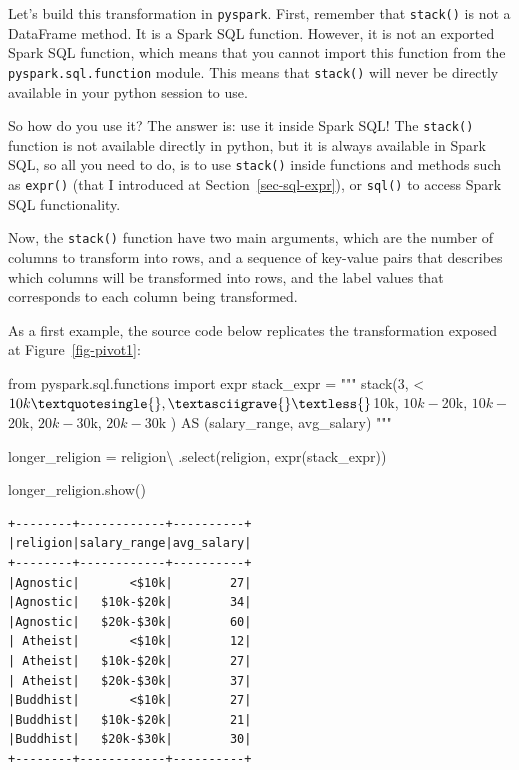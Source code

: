 \documentclass[
  11pt,
  letterpaper,
  DIV=11,
  numbers=noendperiod]{scrreprt}
\newenvironment{Shaded}{\begin{snugshade}}{\end{snugshade}}
\newcommand{\ImportTok}[1]{\textcolor[rgb]{0.00,0.46,0.62}{#1}}
\newcommand{\NormalTok}[1]{\textcolor[rgb]{0.00,0.23,0.31}{#1}}
\newcommand{\OperatorTok}[1]{\textcolor[rgb]{0.37,0.37,0.37}{#1}}
\newcommand{\StringTok}[1]{\textcolor[rgb]{0.13,0.47,0.30}{#1}}
\begin{document}
Let's build this transformation in \texttt{pyspark}. First, remember
that \texttt{stack()} is not a DataFrame method. It is a Spark SQL
function. However, it is not an exported Spark SQL function, which means
that you cannot import this function from the
\texttt{pyspark.sql.function} module. This means that \texttt{stack()}
will never be directly available in your python session to use.

So how do you use it? The answer is: use it inside Spark SQL! The
\texttt{stack()} function is not available directly in python, but it is
always available in Spark SQL, so all you need to do, is to use
\texttt{stack()} inside functions and methods such as \texttt{expr()}
(that I introduced at Section~\ref{sec-sql-expr}), or \texttt{sql()} to
access Spark SQL functionality.

Now, the \texttt{stack()} function have two main arguments, which are
the number of columns to transform into rows, and a sequence of
key-value pairs that describes which columns will be transformed into
rows, and the label values that corresponds to each column being
transformed.

As a first example, the source code below replicates the transformation
exposed at Figure~\ref{fig-pivot1}:

\begin{Shaded}
\begin{Highlighting}[]
\ImportTok{from}\NormalTok{ pyspark.sql.functions }\ImportTok{import}\NormalTok{ expr}
\NormalTok{stack\_expr }\OperatorTok{=} \StringTok{"""}
\StringTok{stack(3,}
\StringTok{    \textquotesingle{}\textless{}$10k\textquotesingle{}, \textasciigrave{}\textless{}$10k\textasciigrave{},}
\StringTok{    \textquotesingle{}$10k{-}$20k\textquotesingle{}, \textasciigrave{}$10k{-}$20k\textasciigrave{},}
\StringTok{    \textquotesingle{}$20k{-}$30k\textquotesingle{}, \textasciigrave{}$20k{-}$30k\textasciigrave{}}
\StringTok{) AS (salary\_range, avg\_salary)}
\StringTok{"""}

\NormalTok{longer\_religion }\OperatorTok{=}\NormalTok{ religion}\OperatorTok{\textbackslash{}}
\NormalTok{    .select(}\StringTok{\textquotesingle{}religion\textquotesingle{}}\NormalTok{, expr(stack\_expr))}

\NormalTok{longer\_religion.show()}
\end{Highlighting}
\end{Shaded}

\begin{verbatim}
+--------+------------+----------+
|religion|salary_range|avg_salary|
+--------+------------+----------+
|Agnostic|       <$10k|        27|
|Agnostic|   $10k-$20k|        34|
|Agnostic|   $20k-$30k|        60|
| Atheist|       <$10k|        12|
| Atheist|   $10k-$20k|        27|
| Atheist|   $20k-$30k|        37|
|Buddhist|       <$10k|        27|
|Buddhist|   $10k-$20k|        21|
|Buddhist|   $20k-$30k|        30|
+--------+------------+----------+
\end{verbatim}
\end{document}
